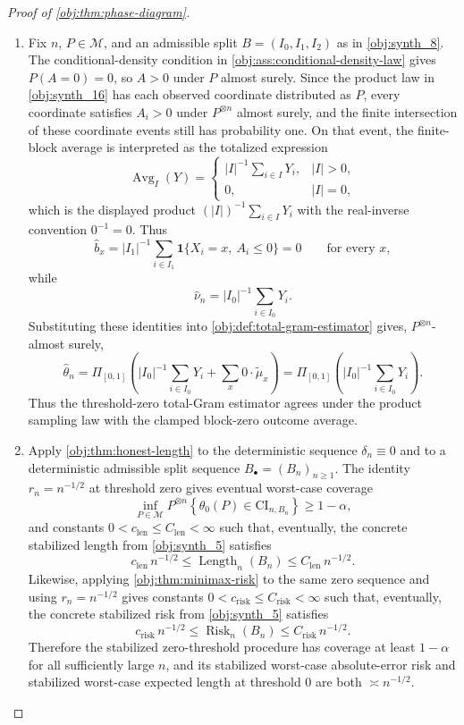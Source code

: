 \documentclass[11pt]{article}
\begin{document}
\begin{proof}[Proof of \cref{obj:thm:phase-diagram}]
\begin{enumerate}
\item Fix \(n\), \(P\in\mathcal M\), and an admissible split \(B=(I_0,I_1,I_2)\)
as in \cref{obj:synth_8}.  The conditional-density condition in
\cref{obj:ass:conditional-density-law} gives \(P(A=0)=0\), so \(A>0\) under \(P\)
almost surely.  Since the product law in
\cref{obj:synth_16} has each observed coordinate distributed as \(P\), every
coordinate satisfies \(A_i>0\) under \(P^{\otimes n}\) almost surely, and the
finite intersection of these coordinate events still has probability one.  On
that event, the finite-block average is interpreted as the totalized expression
\[
\operatorname{Avg}_I(Y)
=
\begin{cases}
|I|^{-1}\sum_{i\in I}Y_i,& |I|>0,\\
0,& |I|=0,
\end{cases}
\]
which is the displayed product \((|I|)^{-1}\sum_{i\in I}Y_i\) with the
real-inverse convention \(0^{-1}=0\).  Thus
\[
\widehat b_x
=
|I_1|^{-1}\sum_{i\in I_1}\mathbf 1\{X_i=x,\ A_i\le0\}
=
0
\qquad\text{for every }x,
\]
while
\[
\widehat\nu_n
=
|I_0|^{-1}\sum_{i\in I_0}Y_i .
\]
Substituting these identities into \cref{obj:def:total-gram-estimator} gives,
\(P^{\otimes n}\)-almost surely,
\[
\widehat\theta_n
=
\Pi_{[0,1]}
\left(
|I_0|^{-1}\sum_{i\in I_0}Y_i
+
\sum_x 0\cdot \widetilde\mu_x
\right)
=
\Pi_{[0,1]}
\left(
|I_0|^{-1}\sum_{i\in I_0}Y_i
\right).
\]
Thus the threshold-zero total-Gram estimator agrees under the product sampling
law with the clamped block-zero outcome average.

\item Apply \cref{obj:thm:honest-length} to the deterministic sequence
\(\delta_n\equiv0\) and to a deterministic admissible split sequence
\(B_\bullet=(B_n)_{n\ge1}\).  The identity \(r_n=n^{-1/2}\) at
threshold zero gives eventual worst-case coverage
\[
\inf_{P\in\mathcal M}
P^{\otimes n}\!
\left\{\theta_0(P)\in \mathrm{CI}_{n,B_n}\right\}
\ge 1-\alpha,
\]
and constants \(0<c_{\mathrm{len}}\le C_{\mathrm{len}}<\infty\) such that,
eventually, the concrete stabilized length from \cref{obj:synth_5} satisfies
\[
c_{\mathrm{len}}\,n^{-1/2}
\le
\operatorname{Length}_n(B_n)
\le
C_{\mathrm{len}}\,n^{-1/2}.
\]
Likewise, applying \cref{obj:thm:minimax-risk} to the same zero sequence and
using \(r_n=n^{-1/2}\) gives constants
\(0<c_{\mathrm{risk}}\le C_{\mathrm{risk}}<\infty\) such that, eventually, the
concrete stabilized risk from \cref{obj:synth_5} satisfies
\[
c_{\mathrm{risk}}\,n^{-1/2}
\le
\operatorname{Risk}_n(B_n)
\le
C_{\mathrm{risk}}\,n^{-1/2}.
\]
Therefore the stabilized zero-threshold procedure has coverage at least
\(1-\alpha\) for all sufficiently large \(n\), and its stabilized worst-case
absolute-error risk and stabilized worst-case expected length at threshold
\(0\) are both \(\asymp n^{-1/2}\).
\end{enumerate}
\end{proof}
\end{document}
